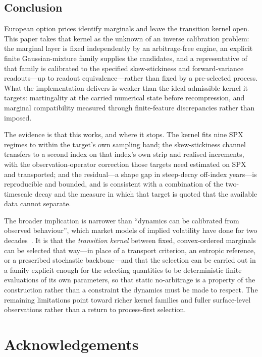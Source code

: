 \documentclass[11pt]{article}
\providecommand{\1}{\mathbf 1}
\begin{document}
\subsection{Conclusion}

European option prices identify marginals and leave the transition kernel open. This paper takes that
kernel as the unknown of an inverse calibration problem: the marginal layer is fixed independently by
an arbitrage-free engine, an explicit finite Gaussian-mixture family supplies the candidates, and a
representative of that family is calibrated to the specified skew-stickiness and forward-variance
readouts---up to readout equivalence---rather than fixed by a pre-selected process. What the
implementation delivers is weaker than the ideal admissible kernel it targets: martingality at the
carried numerical state before recompression, and marginal compatibility measured through
finite-feature discrepancies rather than imposed.

The evidence is that this works, and where it stops. The kernel fits nine SPX regimes to within the
target's own sampling band; the skew-stickiness channel transfers to a second index on that index's
own strip and realised increments, with the observation-operator correction those targets need
estimated on SPX and transported; and the residual---a shape gap in steep-decay off-index
years---is reproducible and bounded, and is consistent with a combination of the two-timescale
decay and the measure in which that target is quoted that the available data cannot separate.

The broader implication is narrower than ``dynamics can be calibrated from observed behaviour'',
which market models of implied volatility have done for two decades~\cite{schonbucher1999,
contdafonseca2002, cohenreisingerwang2021}. It is that the \emph{transition kernel} between fixed,
convex-ordered marginals can be selected that way---in place of a transport criterion, an entropic
reference, or a prescribed stochastic backbone---and that the selection can be carried out in a
family explicit enough for the selecting quantities to be deterministic finite evaluations of its own parameters, so that
static no-arbitrage is a property of the construction rather than a constraint the dynamics must be
made to respect.
The remaining limitations point toward richer kernel families and fuller surface-level observations
rather than a return to process-first selection.

\section*{Acknowledgements}
\end{document}
